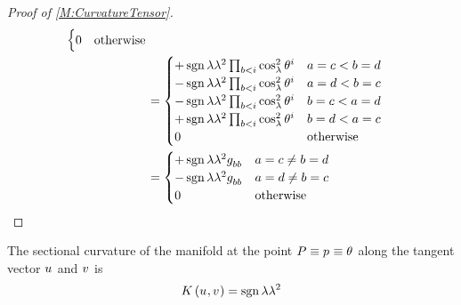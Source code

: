 \documentclass[../methodology.tex]{subfiles}
\begin{document}
\begin{proof}[Proof of \cref{M:CurvatureTensor}]
\begin{align*}
\begin{cases}
          0 & \text{otherwise}      \\
        \end{cases}                                            \\
     & =\begin{cases}
          +\sign{\lambda}\lambda^2
          \prod_{b<i}\cos_\lambda^2\tensor{\theta}{^i}
            & \text{\(a=c<b=d\)} \\
          -\sign{\lambda}\lambda^2
          \prod_{b<i}\cos_\lambda^2\tensor{\theta}{^i}
            & \text{\(a=d<b=c\)} \\
          -\sign{\lambda}\lambda^2
          \prod_{b<i}\cos_\lambda^2\tensor{\theta}{^i}
            & \text{\(b=c<a=d\)} \\
          +\sign{\lambda}\lambda^2
          \prod_{b<i}\cos_\lambda^2\tensor{\theta}{^i}
            & \text{\(b=d<a=c\)} \\
          0 & \text{otherwise}   \\
        \end{cases}                                                                                                                                         \\
     & =\begin{cases}
          +\sign{\lambda}\lambda^2\tensor{g}{_b_b}
            & \text{\(a=c\ne b=d\)} \\
          -\sign{\lambda}\lambda^2\tensor{g}{_b_b}
            & \text{\(a=d\ne b=c\)} \\
          0 & \text{otherwise}      \\
        \end{cases}\qedhere
  \end{align*}
\end{proof}
\begin{lemma}\label{M:SectionalCurvature}
  The sectional curvature of the manifold
  at the point \(P\equiv\tensor{p}{}\equiv\tensor{\theta}{}\)
  along the tangent vector \(\tensor{u}{}\) and \(\tensor{v}{}\)
  is
  \[
    K\left(\tensor{u}{},\tensor{v}{}\right)=\sign{\lambda}\lambda^2
  \]
\end{lemma}
\end{document}
